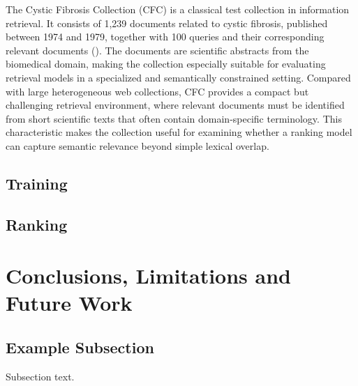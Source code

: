 \documentclass[preprint,5p,times,twocolumn,authoryear]{elsarticle}
\begin{document}
The Cystic Fibrosis Collection (CFC) is a classical test collection in information retrieval. It consists of 1,239 documents related to cystic fibrosis, published between 1974 and 1979, together with 100 queries and their corresponding relevant documents (\cite{HearstCFDataset}). The documents are scientific abstracts from the biomedical domain, making the collection especially suitable for evaluating retrieval models in a specialized and semantically constrained setting. Compared with large heterogeneous web collections, CFC provides a compact but challenging retrieval environment, where relevant documents must be identified from short scientific texts that often contain domain-specific terminology. This characteristic makes the collection useful for examining whether a ranking model can capture semantic relevance beyond simple lexical overlap.


\subsection{Training}

\subsection{Ranking}

\section{Conclusions, Limitations and Future Work}



\subsection{Example Subsection}
\label{subsec1}

Subsection text.

\end{document}
